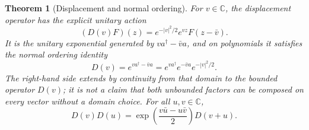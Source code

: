 \documentclass[11pt]{article}
\numberwithin{equation}{section}
\newtheorem{theorem}{Theorem}[section]
\theoremstyle{definition}
\theoremstyle{remark}
\newcommand{\C}{\mathbb{C}}
\begin{document}
\begin{theorem}[Displacement and normal ordering]\label{thm:displacement}
For $v\in\C$, the displacement operator has the explicit unitary
action
\begin{equation}\label{eq:Dexplicit}
 (D(v)F)(z)=e^{-|v|^2/2}e^{vz}F(z-\bar v).
\end{equation}
It is the unitary exponential generated by
$v a^\dagger-\bar v a$, and on polynomials it satisfies the normal
ordering identity
\begin{equation}\label{eq:Dnormal}
 D(v)=e^{v a^\dagger-\bar v a}
     =e^{v a^\dagger}e^{-\bar v a}e^{-|v|^2/2}.
\end{equation}
The right-hand side extends by continuity from that domain to the
bounded operator $D(v)$; it is not a claim that both unbounded
factors can be composed on every vector without a domain choice.
For all $u,v\in\C$,
\begin{equation}\label{eq:Dproduct}
 D(v)D(u)=
 \exp\left(\frac{v\bar u-u\bar v}{2}\right)D(v+u).
\end{equation}
\end{theorem}
\end{document}
